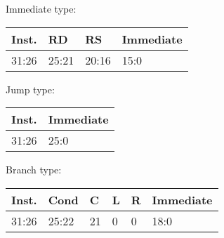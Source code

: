 \documentclass[12pt]{article}
\begin{document}
    \begin{center}
        Immediate type:\\
        \vspace{1em}
        \begin{tabular}{ |p{1.8cm}|p{1.5cm}|p{1.5cm}|p{6.8cm}| }
            \hline
            \textbf{Inst.} & \textbf{RD} &  \textbf{RS} & \textbf{Immediate}\\
            \hline
            31:26& 25:21 & 20:16 &15:0\\
            \hline
        \end{tabular}
    \end{center}
    
    \begin{center}
        Jump type:\\
        \vspace{1em}
        \begin{tabular}{ |p{1.8cm}|p{10.7cm}| }
            \hline
            \textbf{Inst.} & \textbf{Immediate}\\
            \hline
            31:26& 25:0\\
            \hline
        \end{tabular}
    \end{center}
    
    \begin{center}
        Branch type:\\
        \vspace{1em}
        \begin{tabular}{ |p{1.8cm}|p{1.5cm}|p{.3cm}|p{.3cm}|p{.3cm}|p{6.5cm}| }
            \hline
            \textbf{Inst.} & \textbf{Cond} &  \textbf{C} & \textbf{L}&\textbf{R}&\textbf{Immediate}\\
            \hline
            31:26& 25:22 & 21 & 0 & 0 &18:0\\
            \hline
        \end{tabular}
    \end{center}
    
\newpage
\end{document}
